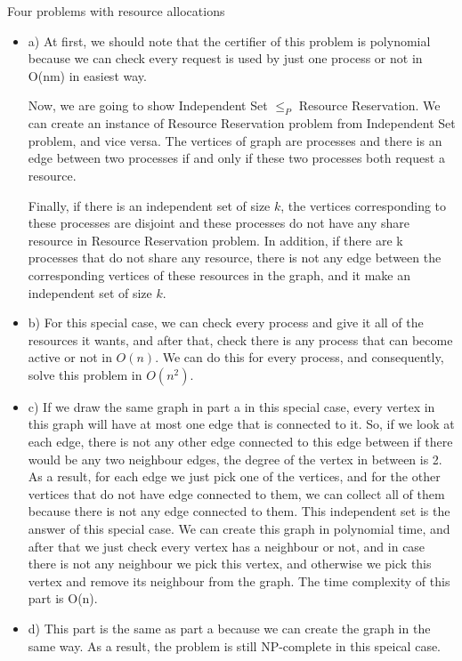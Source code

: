 \documentclass[12pt]{article}
\newenvironment{solution}[2][Solution]{\begin{trivlist}
\item[\hskip \labelsep {\bfseries #1}]}{\end{trivlist}}
\newenvironment{problem}[2][Problem]{\begin{trivlist}
\item[\hskip \labelsep {\bfseries #1}\hskip \labelsep {\bfseries #2.}]}{\end{trivlist}}
\begin{document}
\begin{problem}{2}
Four problems with resource allocations
\end{problem}

\begin{solution}{}
\begin{itemize}
\item a) At first, we should note that the certifier of this problem is polynomial because 
we can check every request is used by just one process or not in O(nm) in easiest way.

Now, we are going to show Independent Set $\leq _P$ Resource Reservation. We can create an
instance of Resource Reservation problem from Independent Set problem, and vice versa.
The vertices of graph are processes and there is an edge between two processes if and only
if these two processes both request a resource.

Finally, if there is an independent set of size $k$, the vertices corresponding to these
processes are disjoint and these processes do not have any share resource in Resource 
Reservation problem. In addition, if there are k processes that do not share any resource,
there is not any edge between the corresponding vertices of these resources in the graph,
and it make an independent set of size $k$.

\item b) For this special case, we can check every process and give it all of the resources
it wants, and after that, check there is any process that can become active or not in $O(n)$.
We can do this for every process, and consequently, solve this problem in $O(n^2)$.

\item c) If we draw the same graph in part a in this special case, every vertex in this graph
will have at most one edge that is connected to it. So, if we look at each edge, there is not
any other edge connected to this edge between if there would be any two neighbour edges, the
degree of the vertex in between is 2. As a result, for each edge we just pick one of the 
vertices, and for the other vertices that do not have edge connected to them, we can collect
all of them because there is not any edge connected to them. This independent set is the answer
of this special case. We can create this graph in polynomial time, and after that we just check
every vertex has a neighbour or not, and in case there is not any neighbour we pick this vertex,
and otherwise we pick this vertex and remove its neighbour from the graph. The time complexity
of this part is O(n).

\item d) This part is the same as part a because we can create the graph in the same way.
As a result, the problem is still NP-complete in this speical case.
\end{itemize}
\end{solution}
\end{document}
